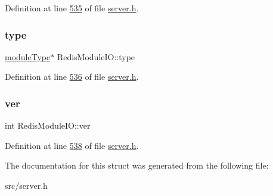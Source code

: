 Definition at line \hyperlink{server_8h_source_l00535}{535} of file \hyperlink{server_8h_source}{server.\+h}.

\mbox{\label{structRedisModuleIO_a3ebe47e7c057c519b95410f07d52ea26}} 
\subsubsection{\texorpdfstring{type}{type}}
{\footnotesize\ttfamily \hyperlink{structRedisModuleType}{module\+Type}$\ast$ Redis\+Module\+I\+O\+::type}



Definition at line \hyperlink{server_8h_source_l00536}{536} of file \hyperlink{server_8h_source}{server.\+h}.

\mbox{\label{structRedisModuleIO_a4356f9b503d1f032cc7e700ee6d0b69d}} 
\subsubsection{\texorpdfstring{ver}{ver}}
{\footnotesize\ttfamily int Redis\+Module\+I\+O\+::ver}



Definition at line \hyperlink{server_8h_source_l00538}{538} of file \hyperlink{server_8h_source}{server.\+h}.



The documentation for this struct was generated from the following file\+:\begin{DoxyCompactItemize}
\item 
src/server.\+h\end{DoxyCompactItemize}
